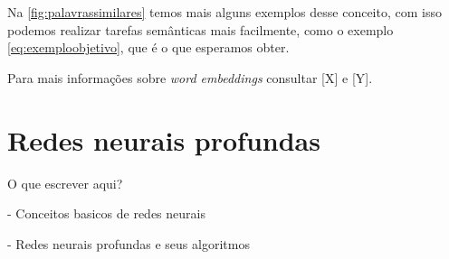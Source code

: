 Na \autoref{fig:palavrassimilares} temos mais alguns exemplos desse conceito, com isso podemos realizar tarefas semânticas mais facilmente, como o exemplo \ref{eq:exemploobjetivo}, que é o que esperamos obter.

Para mais informações sobre \textit{word embeddings} consultar [X] e [Y].



\section{Redes neurais profundas}

O que escrever aqui? 

- Conceitos basicos de redes neurais

- Redes neurais profundas e seus algoritmos

